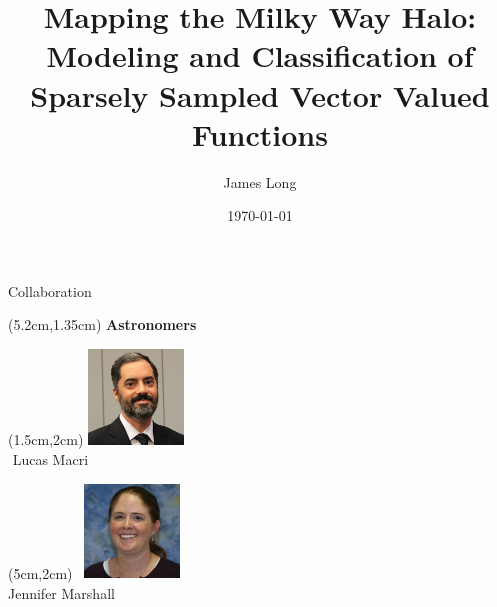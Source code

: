 \documentclass[12pt]{beamer}
\title{Mapping the Milky Way Halo: Modeling and Classification of Sparsely Sampled Vector Valued Functions}
\author{James Long}
\institute{Texas A\&M University}
\date{\today}
\newcommand{\w}{1in}
\newcommand{\h}{1in}
\begin{document}
\frame{\titlepage}

\begin{frame}{Collaboration}


  \begin{textblock*}{3cm}(5.2cm,1.35cm) %
    \textbf{Astronomers}
  \end{textblock*}
  
  \begin{textblock*}{3cm}(1.5cm,2cm) %
\includegraphics[width=\w,height=\h]{figs/Macri.jpg}\\
$\, \, $Lucas Macri
\end{textblock*}


  \begin{textblock*}{3cm}(5cm,2cm) %
 $\, $ \includegraphics[width=\w,height=\h]{figs/marshall.jpg}\\
Jennifer Marshall
\end{textblock*}


\end{frame}
\end{document}
